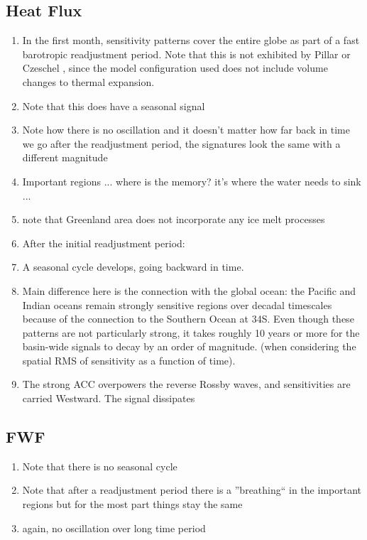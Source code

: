 \documentclass[a4paper,11pt]{article}
\begin{document}
   \subsection{Heat Flux} 
    \begin{enumerate} 
	\item In the first month, sensitivity patterns cover the entire globe as part of a fast barotropic readjustment period. Note that this is not exhibited by Pillar or Czeschel \cite{pillar}, \cite{czeschel} since the model configuration used does not include volume changes to thermal expansion. 
	\item Note that this does have a seasonal signal 
	\item Note how there is no oscillation and it doesn't matter how far back in time we go after the readjustment period, the signatures look the same with a different magnitude
	\item Important regions ... where is the memory? it's where the water needs to sink ... 
	\item note that Greenland area does not incorporate any ice melt processes 
	\item After the initial readjustment period:
	\item A seasonal cycle develops, going backward in time. 
	\item Main difference here is the connection with the global ocean: the Pacific and Indian oceans remain strongly sensitive regions over decadal timescales because of the connection to the Southern Ocean at 34S. Even though these patterns are not particularly strong, it takes roughly 10 years or more for the basin-wide signals to decay by an order of magnitude. (when considering the spatial RMS of sensitivity as a function of time).  
	\item The strong ACC overpowers the reverse Rossby waves, and sensitivities are carried Westward. The signal dissipates 
    \end{enumerate} 
   \subsection{FWF}
    \begin{enumerate}
	\item Note that there is no seasonal cycle
	\item Note that after a readjustment period there is a ''breathing`` in the important regions but for the most part things stay the same 
	\item again, no oscillation over long time period
    \end{enumerate} 
\end{document}
